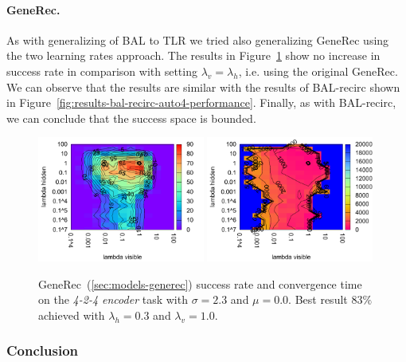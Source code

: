\paragraph{GeneRec.} 
As with generalizing of BAL to TLR we tried also generalizing GeneRec using the two learning rates approach. The results in Figure~\ref{fig:results-generec-auto4-performance} show no increase in success rate in comparison with setting $\lambda_v = \lambda_h$, i.e. using the original GeneRec. We can observe that the results are similar with the results of BAL-recirc shown in Figure~\ref{fig:results-bal-recirc-auto4-performance}. Finally, as with BAL-recirc, we can conclude that the success space is bounded.  
\begin{figure}[H]
  \centering
  \includegraphics[width=0.49\textwidth]{img/generec-auto4-success.pdf}   
  \includegraphics[width=0.49\textwidth]{img/generec-auto4-epoch.pdf}     
  \caption{GeneRec~(\ref{sec:models-generec}) success rate and convergence time on the \emph{4-2-4 encoder} task with $\sigma = 2.3$ and $\mu = 0.0$. Best result $83\%$ achieved with $\lambda_h = 0.3$ and $\lambda_v=1.0$.}
  \label{fig:results-generec-auto4-performance}
\end{figure}



\subsubsection{Conclusion} 
\label{sec:tlr-auto4-conclusion} 

